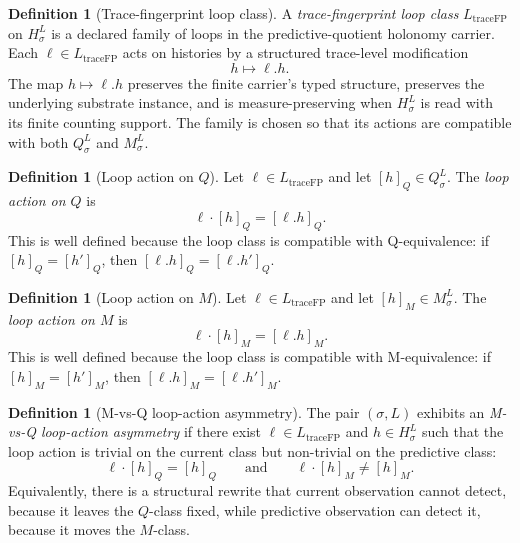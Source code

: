 \documentclass[11pt]{article}
\newcommand{\Substrate}{\sigma}             \newcommand{\Lift}{L}                       \newcommand{\LiftState}{\sigma_{L}}         \newcommand{\HistorySpace}{H_{\Substrate}^{\Lift}}
\newcommand{\Qquotient}{Q_{\Substrate}^{\Lift}}
\newcommand{\Mquotient}{M_{\Substrate}^{\Lift}}
\newcommand{\Qclass}[1]{[#1]_{Q}}
\newcommand{\Mclass}[1]{[#1]_{M}}
\newcommand{\TraceFPLoopClass}{L_{\mathrm{traceFP}}}
\newcommand{\LoopActionQ}[2]{#1\cdot\Qclass{#2}}
\newcommand{\LoopActionM}[2]{#1\cdot\Mclass{#2}}
\theoremstyle{definition}
\newtheorem{definition}[theorem]{Definition}
\begin{document}
\begin{definition}[Trace-fingerprint loop class]
\label{def:trace-fingerprint-loop-class}
A \emph{trace-fingerprint loop class}
\(\TraceFPLoopClass\) on \(\HistorySpace\) is a declared family of
loops in the predictive-quotient holonomy carrier.  Each
\(\ell\in\TraceFPLoopClass\) acts on histories by a structured
trace-level modification
\[
  h\longmapsto \ell.h .
\]
The map \(h\mapsto\ell.h\) preserves the finite carrier's typed
structure, preserves the underlying substrate instance, and is
measure-preserving when \(\HistorySpace\) is read with its finite
counting support.  The family is chosen so that its actions are
compatible with both \(\Qquotient\) and \(\Mquotient\).
\end{definition}

\begin{definition}[Loop action on \(Q\)]
\label{def:loop-action-q}
Let \(\ell\in\TraceFPLoopClass\) and let \(\Qclass{h}\in\Qquotient\).
The \emph{loop action on \(Q\)} is
\[
  \LoopActionQ{\ell}{h}=\Qclass{\ell.h}.
\]
This is well defined because the loop class is compatible with
Q-equivalence: if \(\Qclass{h}=\Qclass{h'}\), then
\(\Qclass{\ell.h}=\Qclass{\ell.h'}\).
\end{definition}

\begin{definition}[Loop action on \(M\)]
\label{def:loop-action-m}
Let \(\ell\in\TraceFPLoopClass\) and let \(\Mclass{h}\in\Mquotient\).
The \emph{loop action on \(M\)} is
\[
  \LoopActionM{\ell}{h}=\Mclass{\ell.h}.
\]
This is well defined because the loop class is compatible with
M-equivalence: if \(\Mclass{h}=\Mclass{h'}\), then
\(\Mclass{\ell.h}=\Mclass{\ell.h'}\).
\end{definition}

\begin{definition}[M-vs-Q loop-action asymmetry]
\label{def:asymmetry}
The pair \((\Substrate,\Lift)\) exhibits an
\emph{M-vs-Q loop-action asymmetry} if there exist
\(\ell\in\TraceFPLoopClass\) and \(h\in\HistorySpace\) such that the
loop action is trivial on the current class but non-trivial on the
predictive class:
\[
  \LoopActionQ{\ell}{h}=\Qclass{h}
  \qquad\text{and}\qquad
  \LoopActionM{\ell}{h}\neq\Mclass{h}.
\]
Equivalently, there is a structural rewrite that current observation
cannot detect, because it leaves the \(Q\)-class fixed, while
predictive observation can detect it, because it moves the
\(M\)-class.
\end{definition}
\end{document}
